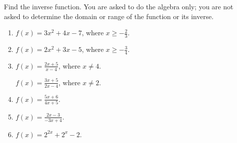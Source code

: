 Find the inverse function. You are asked to do the algebra only; you are not asked to determine the domain or range of the function or its inverse. 
\begin{enumerate} [ref={\fcProblemRef}]
\item $f(x)= 3x^2+4x-7$, where $x\geq -\frac{2}{3}$.

\item $f(x)= 2x^2+3x-5$, where $x\geq -\frac{3}{4}$.

\item $\displaystyle f(x)= \frac{2x+5}{x-4}$, where $x\neq 4$.

 \label{problemFindInversef=(3x+5)/(2x-4)} $\displaystyle f(x)= \frac{3x+5}{2x-4}$, where $x\neq 2$.

\item \label{problemFindIversef=(5x+6)/(4x+5)}  $\displaystyle f(x)= \frac{5x+6}{4x+5}$.

\item  $\displaystyle f(x)= \frac{2x-3}{-3x+4}$.

\item $f(x)=2^{2x}+2^{x}-2$.

\end{enumerate}
